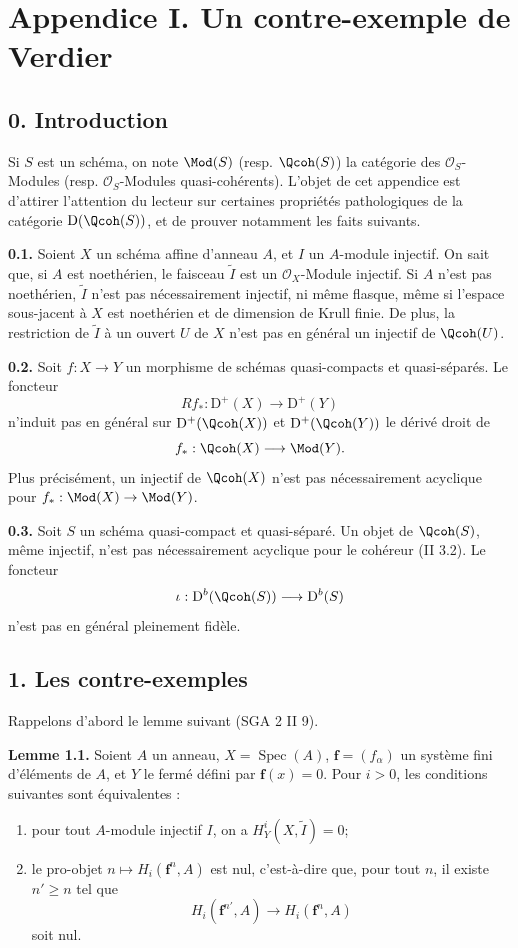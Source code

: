 \documentclass[11pt]{article}
\newcommand{\Spec}{\operatorname{Spec}}
\begin{document}
\section*{Appendice I. Un contre-exemple de Verdier}

\subsection*{0. Introduction}
Si $S$ est un schéma, on note $\Mod(S)$ (resp. $\Qcoh(S)$) la catégorie des $\mathcal O_S$-Modules (resp. $\mathcal O_S$-Modules quasi-cohérents). L'objet de cet appendice est d'attirer l'attention du lecteur sur certaines propriétés pathologiques de la catégorie $\mathrm D(\Qcoh(S))$, et de prouver notamment les faits suivants.

\textbf{0.1.} Soient $X$ un schéma affine d'anneau $A$, et $I$ un $A$-module injectif. On sait que, si $A$ est noethérien, le faisceau $\widetilde I$ est un $\mathcal O_X$-Module injectif. Si $A$ n'est pas noethérien, $\widetilde I$ n'est pas nécessairement injectif, ni même flasque, même si l'espace sous-jacent à $X$ est noethérien et de dimension de Krull finie. De plus, la restriction de $\widetilde I$ à un ouvert $U$ de $X$ n'est pas en général un injectif de $\Qcoh(U)$.

\textbf{0.2.} Soit $f:X\to Y$ un morphisme de schémas quasi-compacts et quasi-séparés. Le foncteur
\[
 Rf_*:\mathrm D^+(X)\longrightarrow\mathrm D^+(Y)
\]
n'induit pas en général sur $\mathrm D^+(\Qcoh(X))$ et $\mathrm D^+(\Qcoh(Y))$ le dérivé droit de
\[
 f_*:\Qcoh(X)\longrightarrow\Mod(Y).
\]
Plus précisément, un injectif de $\Qcoh(X)$ n'est pas nécessairement acyclique pour $f_*:\Mod(X)\to\Mod(Y)$.

\textbf{0.3.} Soit $S$ un schéma quasi-compact et quasi-séparé. Un objet de $\Qcoh(S)$, même injectif, n'est pas nécessairement acyclique pour le cohéreur (II 3.2). Le foncteur
\[
 \iota:\mathrm D^b(\Qcoh(S))\longrightarrow\mathrm D^b(S)
\]
n'est pas en général pleinement fidèle.

\subsection*{1. Les contre-exemples}
Rappelons d'abord le lemme suivant (SGA 2 II 9).

\textbf{Lemme 1.1.} Soient $A$ un anneau, $X=\Spec(A)$, $\mathbf f=(f_\alpha)$ un système fini d'éléments de $A$, et $Y$ le fermé défini par $\mathbf f(x)=0$. Pour $i>0$, les conditions suivantes sont équivalentes :
\begin{enumerate}[label=(\roman*)]
\item pour tout $A$-module injectif $I$, on a $H^i_Y(X,\widetilde I)=0$;
\item le pro-objet $n\mapsto H_i(\mathbf f^n,A)$ est nul, c'est-à-dire que, pour tout $n$, il existe $n'\geq n$ tel que
\[
 H_i(\mathbf f^{n'},A)\longrightarrow H_i(\mathbf f^n,A)
\]
soit nul.
\end{enumerate}
\end{document}

